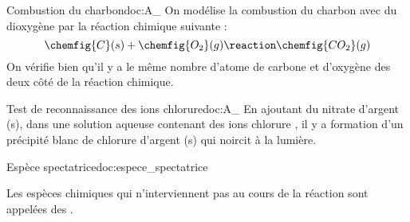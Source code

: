 \begin{doc}{Combustion du charbon}{doc:A_}
  On modélise la combustion du charbon avec du dioxygène par la réaction chimique suivante :
  \begin{equation*}
    \chemfig{C}(s) + \chemfig{O_2}(g) \reaction \chemfig{CO_2}(g)
  \end{equation*}
  On vérifie bien qu'il y a le même nombre d'atome de carbone et d'oxygène des deux côté de la réaction chimique.
\end{doc}





\begin{doc}{Test de reconnaissance des ions chlorure}{doc:A_}
  En ajoutant du nitrate d'argent (s), dans une solution aqueuse contenant des ions chlorure , il y a formation d'un précipité blanc de chlorure d'argent (s) qui noircit à la lumière.
\end{doc}



\vspace*{-4pt}
\begin{doc}{Espèce spectatrice}{doc:espece_spectatrice}
  \begin{importants}
    Les espèces chimiques qui n'interviennent pas au cours de la réaction sont appelées des .
  \end{importants}
\end{doc}
